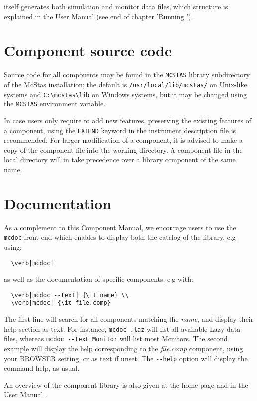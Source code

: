 \MCS itself generates both simulation and monitor data files, which structure is explained in the User Manual (see end of chapter 'Running \MCS ').

\section{Component source code}
Source code for all components may be found in the \verb+MCSTAS+ library
subdirectory of the McStas installation;
the default is \verb+/usr/local/lib/mcstas/+
on Unix-like systems and \verb+C:\mcstas\lib+ on Windows systems, but it may be
changed using the \verb+MCSTAS+ environment variable.

In case users only require to add new features, preserving the existing features of a component,
using the \verb+EXTEND+ keyword in the instrument description file is recommended. For larger modification of a component, it is advised to make a copy
of the component file into the working directory.
A component file in the local directory will in \MCS take precedence over
a library component of the same name.

\section{Documentation}
As a complement to this Component Manual, we encourage users to use
the \verb+mcdoc+ front-end which enables to display both the
catalog of the \MCS library, e.g using: 
\begin{lstlisting}
  \verb|mcdoc|
\end{lstlisting}
as well as the documentation of specific components, e.g with:
\begin{lstlisting}
  \verb|mcdoc --text| {\it name} \\
  \verb|mcdoc| {\it file.comp}
\end{lstlisting}
The first line will search for all components matching the {\it name},
and display their help section as text. For instance, \verb+mcdoc .laz+ will list all available Lazy data files, whereas \verb+mcdoc --text Monitor+ will list most Monitors.
The second example will display the help corresponding to
the {\it file.comp} component, using your
BROWSER setting, or as text if unset.
The \verb+--help+ option will display the command help, as usual.

An overview of the component library is also given at the \MCS home page \cite{mcstas_webpage} and in the User Manual \cite{mcstasmanual}.

